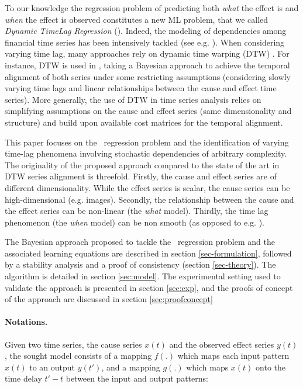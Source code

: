 To our knowledge the regression problem of predicting both {\em what} the effect is and {\em when} the effect is observed constitutes a new ML problem, 
that we called {\em Dynamic TimeLag Regression} (\XX). Indeed, the modeling of dependencies among financial 
time series has been intensively tackled (see e.g. \citet{ZHOU2006195}). When considering varying time lag, 
many approaches rely on dynamic time warping (DTW) \citep{SakoeShiba1978}. For instance, DTW is used in 
\citet{SignalDiffusion}, taking a Bayesian approach to achieve the temporal alignment of both series under some restricting assumptions 
(considering slowly varying time lags and linear relationships between the cause and effect time series). More generally, 
the use of DTW in time series analysis relies on simplifying assumptions on the cause and effect series 
(same dimensionality and structure) and build upon available cost 
matrices for the temporal alignment. 

This paper focuses on the \XX\ regression problem and the identification of varying time-lag phenomena involving stochastic dependencies of
arbitrary complexity. The originality of the proposed approach compared to the state of the art 
in DTW series alignment is threefold. Firstly, the cause and effect series are of different dimensionality. 
While the effect series is scalar, the cause series can be high-dimensional (e.g. images). %
Secondly, the relationship 
between the cause and the effect series can be non-linear (the {\em what} model). Thirdly, the time lag phenomenon 
(the {\em when} model) can be non smooth (as opposed to e.g. \citet{ZHOU2006195}).

The Bayesian approach proposed to tackle the \XX\ regression problem and the associated learning 
equations are described in section \ref{sec-formulation}, followed by a stability analysis and a 
proof of consistency (section \ref{sec-theory}). The algorithm is detailed in section \ref{sec:model}. 
The experimental setting used to validate the approach is presented in section \ref{sec:exp}, and 
the proofs of concept of the approach are discussed in section \ref{sec:proofconcept}

\paragraph{Notations.}
Given two time series, the cause series $x(t)$ and the observed effect series $y(t)$, the sought model 
consists of a mapping $f(.)$ which maps each input pattern $x(t)$ to an output $y(t')$, and a 
mapping $g(.)$ which maps $x(t)$ onto the time delay $t'-t$ between the input and output patterns:

